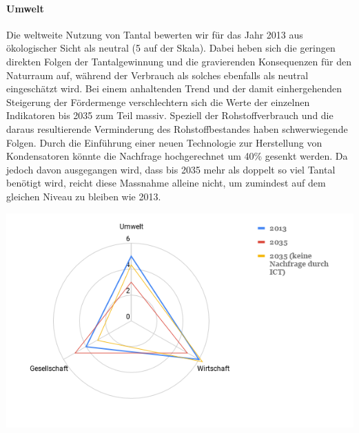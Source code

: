 \paragraph{Umwelt}
Die weltweite Nutzung von Tantal bewerten wir für das Jahr 2013 aus ökologischer
Sicht als neutral (5 auf der Skala). Dabei heben sich die geringen direkten
Folgen der Tantalgewinnung und die gravierenden Konsequenzen für den Naturraum
auf, während der Verbrauch als solches ebenfalls als neutral eingeschätzt wird.
Bei einem anhaltenden Trend und der damit einhergehenden Steigerung der
Fördermenge verschlechtern sich die Werte der einzelnen Indikatoren bis 2035 zum
Teil massiv. Speziell der Rohstoffverbrauch und die daraus resultierende
Verminderung des Rohstoffbestandes haben schwerwiegende Folgen. Durch die
Einführung einer neuen Technologie zur Herstellung von Kondensatoren könnte die
Nachfrage hochgerechnet um 40\% gesenkt werden. Da jedoch davon ausgegangen
wird, dass bis 2035 mehr als doppelt so viel Tantal benötigt wird, reicht
diese Massnahme alleine nicht, um zumindest auf dem gleichen Niveau zu bleiben
wie 2013. 
\begin{center}
\includegraphics[width=14cm]{images/tantal-results}
\end{center}
